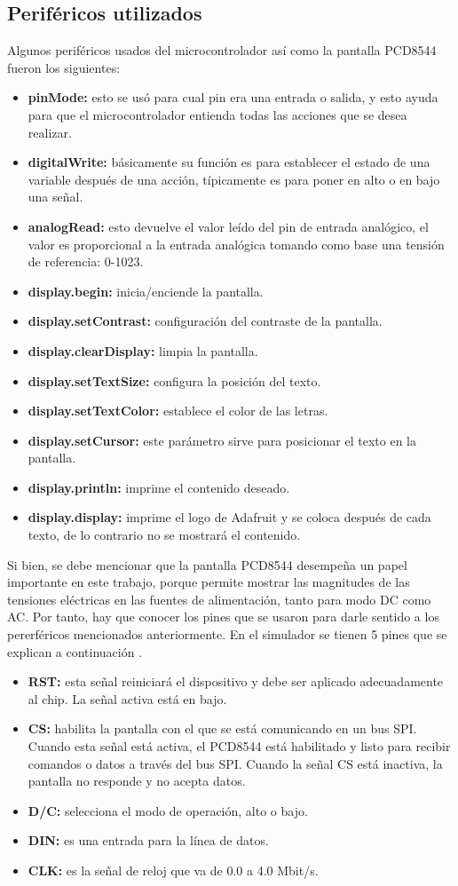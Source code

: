 \subsection*{Periféricos utilizados}
Algunos periféricos usados del microcontrolador así como la pantalla PCD8544 fueron los siguientes:
\begin{itemize}
\item \textbf{pinMode:} esto se usó para cual pin era una entrada o salida, y esto ayuda para que el microcontrolador entienda todas las acciones que se desea realizar.
\item \textbf{digitalWrite:} básicamente su función es para establecer el estado de una variable después de una acción, típicamente es para poner en alto o en bajo una señal.
\item \textbf{analogRead:} esto devuelve el valor leído del pin de entrada analógico, el valor es proporcional a la entrada analógica tomando como base una tensión de referencia: 0-1023.
\item \textbf{display.begin:} inicia/enciende la pantalla.
\item \textbf{display.setContrast:} configuración del contraste de la pantalla.
\item \textbf{display.clearDisplay:} limpia la pantalla.
\item \textbf{display.setTextSize:} configura la posición del texto.
\item \textbf{display.setTextColor:} establece el color de las letras.
\item \textbf{display.setCursor:} este parámetro sirve para posicionar el texto en la pantalla.
\item \textbf{display.println:} imprime el contenido deseado.
\item \textbf{display.display:} imprime el logo de Adafruit y se coloca después de cada texto, de lo contrario no se mostrará el contenido.
\end{itemize}
Si bien, se debe mencionar que la pantalla PCD8544 desempeña un papel importante en este trabajo, porque permite mostrar las magnitudes de las tensiones eléctricas en las fuentes de alimentación, tanto para modo DC como AC. Por tanto, hay que conocer los pines que se usaron para darle sentido a los pererféricos mencionados anteriormente. En el simulador se tienen 5 pines que se explican a continuación \cite{web2}.
\begin{itemize}
\item \textbf{RST:} esta señal reiniciará el dispositivo y debe ser aplicado adecuadamente al chip. La señal activa está en bajo.
\item \textbf{CS:} habilita la pantalla con el que se está comunicando en un bus SPI. Cuando esta señal está activa, el PCD8544 está habilitado y listo para recibir comandos o datos a través del bus SPI. Cuando la señal CS está inactiva, la pantalla no responde y no acepta datos.
\item \textbf{D/C:} selecciona el modo de operación, alto o bajo.
\item \textbf{DIN:} es una entrada para la línea de datos.
\item \textbf{CLK:} es la señal de reloj que va de 0.0 a 4.0 Mbit/s.
\end{itemize}
